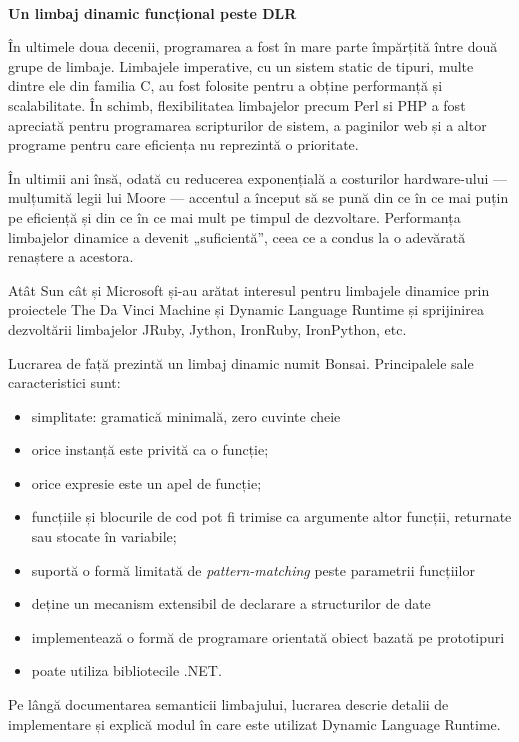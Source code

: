 \documentclass[12pt,a4paper]{memoir}
\begin{document}
\thispagestyle{empty}
\begin{centering}
\textbf{\\\Large{Un limbaj dinamic funcțional peste DLR}}
\\[1.5cm]
\end{centering}
În ultimele doua decenii, programarea a fost în mare parte împărțită între două grupe de limbaje. Limbajele imperative, cu un sistem static de tipuri, multe dintre ele din familia C, au fost folosite pentru a obține performanță și scalabilitate. În schimb, flexibilitatea limbajelor precum Perl si PHP a fost apreciată pentru programarea scripturilor de sistem, a paginilor web și a altor programe pentru care eficiența nu reprezintă o prioritate.

În ultimii ani însă, odată cu reducerea exponențială a costurilor hardware-ului — mulțumită legii lui Moore — accentul a început să se pună din ce în ce mai puțin pe eficiență și din ce în ce mai mult pe timpul de dezvoltare. Performanța limbajelor dinamice a devenit „suficientă”, ceea ce a condus la o adevărată renaștere a acestora.

Atât Sun cât și Microsoft și-au arătat interesul pentru limbajele dinamice prin proiectele The Da Vinci Machine și Dynamic Language Runtime și sprijinirea dezvoltării limbajelor JRuby, Jython, IronRuby, IronPython, etc.

Lucrarea de față prezintă un limbaj dinamic numit Bonsai. Principalele sale caracteristici sunt:
\begin{itemize}
\item simplitate: gramatică minimală, zero cuvinte cheie
\item orice instanță este privită ca o funcție;
\item orice expresie este un apel de funcție;
\item funcțiile și blocurile de cod pot fi trimise ca argumente altor funcții, returnate sau stocate în variabile;
\item suportă o formă limitată de \emph{pattern-matching} peste parametrii funcțiilor
\item deține un mecanism extensibil de declarare a structurilor de date 
\item implementează o formă de programare orientată obiect bazată pe prototipuri
\item poate utiliza bibliotecile .NET.
\end{itemize}

Pe lângă documentarea semanticii limbajului, lucrarea descrie detalii de implementare și explică modul în care este utilizat Dynamic Language Runtime.
\end{document}
